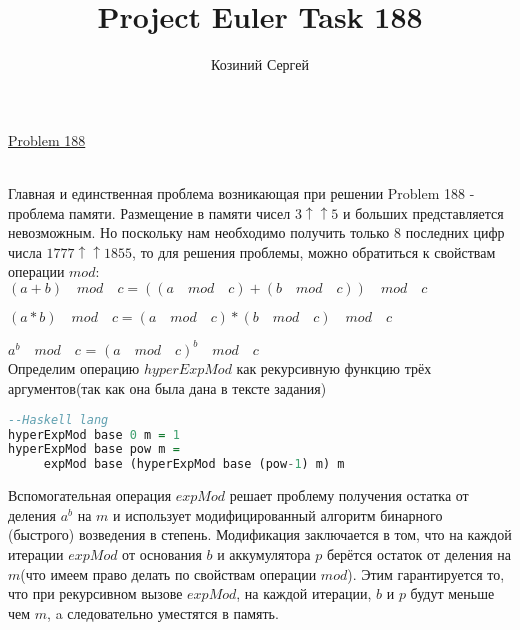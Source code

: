 \documentclass[11pt,a4paper]{article}
\title{Project Euler Task 188}
\author{Козиний Сергей}
\begin{document}
    
\maketitle
\href{''https://projecteuler.net/problem=188''}{Problem 188}

\\



Главная и единственная проблема возникающая при решении Problem 188 - проблема памяти. Размещение в памяти чисел  ${3 ↑↑ 5}$ и больших представляется невозможным. Но поскольку нам необходимо получить только 8 последних цифр числа $1777 ↑↑ 1855$, то для решения проблемы, можно обратиться к свойствам операции $mod$:\\

$ (a+b) \quad mod \quad c = ( (a \quad mod \quad c) + (b \quad mod \quad c) )\quad mod \quad c $

$ (a*b) \quad  mod \quad c =  (a \quad mod \quad c) * (b \quad mod \quad c) \quad mod \quad c $

$ a^b \quad mod \quad c $ =  $ (a \quad mod \quad  c)^b  \quad mod \quad c $ \\

Определим операцию $hyperExpMod$ как рекурсивную функцию трёх аргументов(так как она была дана в тексте задания)

\begin{lstlisting}[language=Haskell, frame=single]
--Haskell lang
hyperExpMod base 0 m = 1
hyperExpMod base pow m =
     expMod base (hyperExpMod base (pow-1) m) m
\end{lstlisting}

Вспомогательная операция ${expMod}$ решает проблему получения остатка от деления $a^b$ на $m$ и использует модифицированный алгоритм бинарного (быстрого) возведения в степень.
Модификация заключается в том, что на каждой итерации $expMod$ от основания $b$ и аккумулятора $p$ берётся остаток от деления на $m$(что имеем право делать по свойствам операции $mod$). Этим гарантируется то, что при рекурсивном вызове $expMod$, на каждой итерации, $b$ и $p$ будут меньше чем $m$, a следовательно уместятся в память.
\end{document}
